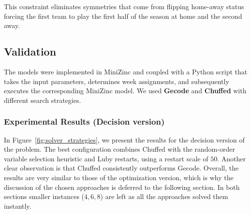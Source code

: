 This constraint eliminates symmetries that come from flipping home-away status forcing the first team to play the first half of the season at home and the second away.

\subsection{Validation}
The models were implemented in MiniZinc and coupled with a Python script that takes the input parameters, determines week assignments, and subsequently executes the corresponding MiniZinc model. We used \textbf{Gecode} and \textbf{Chuffed} with different search strategies. 

\subsubsection{Experimental Results (Decision version)}

In Figure~\ref{fig:solver_strategies}, we present the results for the decision version of the problem. The best configuration combines Chuffed with the random-order variable selection heuristic and Luby restarts, using a restart scale of $50$. Another clear observation is that Chuffed consistently outperforms Gecode. Overall, the results are very similar to those of the optimization version, which is why the discussion of the chosen approaches is deferred to the following section. In both sections smaller instances ($4,6,8$) are left as all the approaches solved them instantly.

